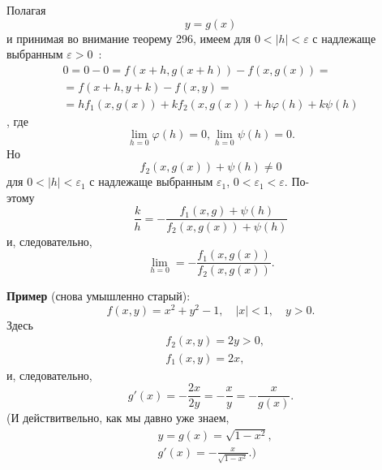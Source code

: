 \noindent Полагая
$$
    y = g (x)
$$
и принимая во внимание теорему  296, имеем для $0 < |h| < \varepsilon  $
с надлежаще выбранным  $\varepsilon > 0$\ :
\begin{gather*}
    0 = 0 - 0 = f (x + h, g (x + h)) - f (x,g (x)) =\\
    = f (x + h, y + k) - f (x, y) = \\
    = hf_1 (x, g (x)) + kf_2 (x, g (x)) + h\varphi (h) + k\psi (h)
\end{gather*}
, где
$$
    \lim_{ h = 0} \varphi (h) = 0, \lim_{ h = 0} \psi (h) = 0\text{.}
$$
Но
$$
    f_2 (x, g (x)) + \psi (h) \neq 0
$$
для $0 < |h| < \varepsilon_1$ с надлежаще выбранным $\varepsilon_1$,  $0 < \varepsilon_1 < \varepsilon.$
По-\\этому
$$
        \frac{k}{h} = - \frac{f_1 (x, g ) + \psi (h)}{f_2 (x, g (x)) + \psi (h)}
$$
и, следовательно,
$$
        \lim_{h = 0} = - \frac{f_1 (x, g (x))}{f_2 (x, g (x))}\text{.}
$$
\par\textbf{Пример} (снова умышленно старый):
$$
        f (x,y) = x^2 + y^2 -1,\quad |x| < 1,\quad y > 0\text{.}
$$
Здесь
\begin{align*}
        & f_2 (x,y) = 2y > 0,\\
        & f_1 (x,y) = 2x,
\end{align*}
и, следовательно,
$$
        g' (x) = -\frac{2x}{2y} = -\frac{x}{y} = -\frac{x}{g (x)}\text{.}
$$
(И действитвельно, как мы давно уже знаем,
\begin{align*}
    & y = g (x) = \sqrt{1 - x^2},\\
    & g' (x) = -\frac x{\sqrt{1 - x^2}}\text{.)}
\end{align*}